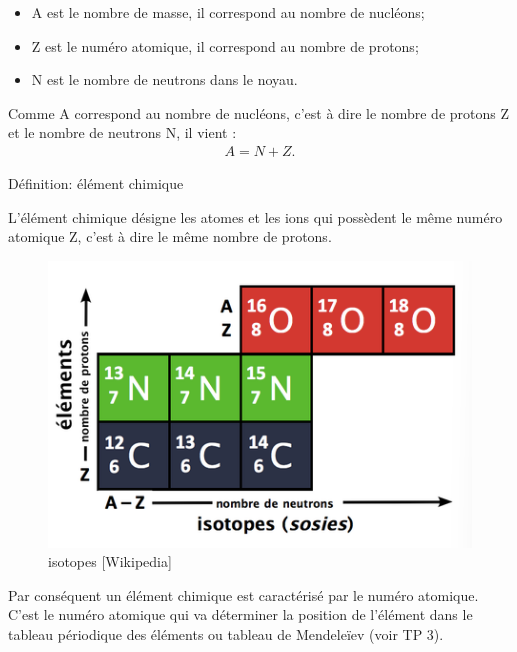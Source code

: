 \documentclass[french]{article}
\begin{document}
\begin{minipage}{3cm}%
\Huge{}
\end{minipage}
\begin{minipage}{13cm}%
	\begin{definition}{}
		
	\begin{itemize}
		\item A est le nombre de masse, il correspond au nombre de nucléons;
		\item Z est le numéro atomique, il correspond au nombre de protons;
		\item N est le nombre de neutrons dans le noyau. 
	\end{itemize}
	
\end{definition}
\end{minipage}\medskip

Comme A correspond au nombre de nucléons, c'est à dire le nombre de protons Z et le nombre de neutrons N, il vient : 
\begin{eqnarray}
	A = N + Z.
\end{eqnarray}

\begin{definition}{Définition: élément chimique}

	L'élément chimique désigne les atomes et les ions qui possèdent le même numéro atomique Z, c'est à dire le même nombre de protons.

\end{definition}

\begin{figure}
	\vspace{-.5cm}
	\centering
	\includegraphics[width=.4\textwidth]{isotopes.png}
	\caption{isotopes [Wikipedia]}
\end{figure}

Par conséquent un élément chimique est caractérisé par le numéro atomique. C'est le numéro atomique qui va déterminer la position de l'élément dans le tableau périodique des éléments ou tableau de Mendeleïev (voir TP 3).\medskip
\end{document}
